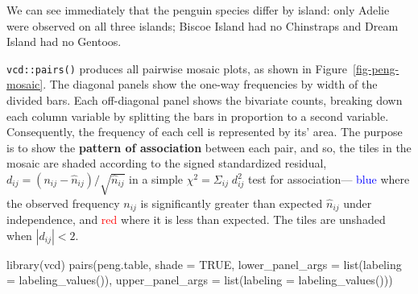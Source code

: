 \documentclass[
  letterpaper,
  10pt,
  krantz2]{krantz}
\makeatletter
\newenvironment{Shaded}{\begin{snugshade}}{\end{snugshade}}
\newcommand{\AttributeTok}[1]{\textcolor[rgb]{0.40,0.45,0.13}{#1}}
\newcommand{\ConstantTok}[1]{\textcolor[rgb]{0.56,0.35,0.01}{#1}}
\newcommand{\FunctionTok}[1]{\textcolor[rgb]{0.28,0.35,0.67}{#1}}
\newcommand{\NormalTok}[1]{\textcolor[rgb]{0.00,0.23,0.31}{#1}}
\newenvironment{kframe}{%
  \medskip{}
  \setlength{\fboxsep}{.8em}
  \def\at@end@of@kframe{}%
  \ifinner\ifhmode%
  \def\at@end@of@kframe{\end{minipage}}%
  \begin{minipage}{\columnwidth}%
  \fi\fi%
  \def\FrameCommand##1{\hskip\@totalleftmargin \hskip-\fboxsep
  \colorbox{shadecolor}{##1}\hskip-\fboxsep
      \hskip-\linewidth \hskip-\@totalleftmargin \hskip\columnwidth}%
  \MakeFramed {\advance\hsize-\width
    \@totalleftmargin\z@ \linewidth\hsize
    \@setminipage}}%
{\par\unskip\endMakeFramed%
  \at@end@of@kframe}
\renewenvironment{Shaded}{\begin{kframe}}{\end{kframe}}
\makeatother
\begin{document}
We can see immediately that the penguin species differ by island: only
Adelie were observed on all three islands; Biscoe Island had no
Chinstraps and Dream Island had no Gentoos.

\texttt{vcd::pairs()} produces all pairwise mosaic plots, as shown in
Figure~\ref{fig-peng-mosaic}. The diagonal panels show the one-way
frequencies by width of the divided bars. Each off-diagonal panel shows
the bivariate counts, breaking down each column variable by splitting
the bars in proportion to a second variable. Consequently, the frequency
of each cell is represented by its' area. The purpose is to show the
\textbf{pattern of association} between each pair, and so, the tiles in
the mosaic are shaded according to the signed standardized residual,
\(d_{ij} = (n_{ij} - \hat{n}_{ij}) / \sqrt{\hat{n}_{ij}}\) in a simple
\(\chi^2 = \Sigma_{ij} \; d_{ij}^2\) test for association---
\textcolor{blue}{blue} where the observed frequency \(n_{ij}\) is
significantly greater than expected \(\hat{n}_{ij}\) under independence,
and \textcolor{red}{red} where it is less than expected. The tiles are
unshaded when \(| d_{ij} | < 2\).

\begin{Shaded}
\begin{Highlighting}[]
\FunctionTok{library}\NormalTok{(vcd)}
\FunctionTok{pairs}\NormalTok{(peng.table, }\AttributeTok{shade =} \ConstantTok{TRUE}\NormalTok{,}
      \AttributeTok{lower\_panel\_args =} \FunctionTok{list}\NormalTok{(}\AttributeTok{labeling =} \FunctionTok{labeling\_values}\NormalTok{()),}
      \AttributeTok{upper\_panel\_args =} \FunctionTok{list}\NormalTok{(}\AttributeTok{labeling =} \FunctionTok{labeling\_values}\NormalTok{()))}
\end{Highlighting}
\end{Shaded}
\end{document}
